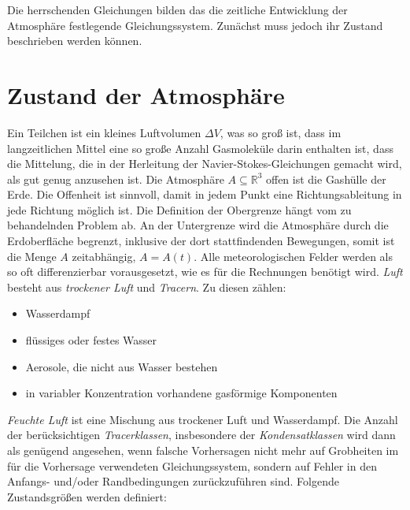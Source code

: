 \documentclass{book}
\begin{document}
Die herrschenden Gleichungen bilden das die zeitliche Entwicklung der Atmosphäre festlegende Gleichungssystem. Zunächst muss jedoch ihr Zustand beschrieben werden können.

\section{Zustand der Atmosphäre}
\label{sec:zustand_der_atmosphaere}

Ein Teilchen ist ein kleines Luftvolumen $\Delta V$, was so groß ist, dass im langzeitlichen Mittel eine so große Anzahl Gasmoleküle darin enthalten ist, dass die Mittelung, die in der Herleitung der Navier-Stokes-Gleichungen gemacht wird, als gut genug anzusehen ist. Die Atmosphäre $A\subseteq\mathbb{R}^3$ offen ist die Gashülle der Erde. Die Offenheit ist sinnvoll, damit in jedem Punkt eine Richtungsableitung in jede Richtung möglich ist. Die Definition der Obergrenze hängt vom zu behandelnden Problem ab. An der Untergrenze wird die Atmosphäre durch die Erdoberfläche begrenzt, inklusive der dort stattfindenden Bewegungen, somit ist die Menge $A$ zeitabhängig, $A = A\left(t\right)$. Alle meteorologischen Felder werden als so oft differenzierbar vorausgesetzt, wie es für die Rechnungen benötigt wird. \textit{Luft} besteht aus \textit{trockener Luft} und \textit{Tracern}. Zu diesen zählen:
%
\begin{itemize}
\item Wasserdampf
\item flüssiges oder festes Wasser
\item Aerosole, die nicht aus Wasser bestehen
\item in variabler Konzentration vorhandene gasförmige Komponenten
\end{itemize}
%
\textit{Feuchte Luft} ist eine Mischung aus trockener Luft und Wasserdampf. Die Anzahl der berücksichtigen \textit{Tracerklassen}, insbesondere der \textit{Kondensatklassen} wird dann als genügend angesehen, wenn falsche Vorhersagen nicht mehr auf Grobheiten im für die Vorhersage verwendeten Gleichungssystem, sondern auf Fehler in den Anfangs- und/oder Randbedingungen zurückzuführen sind. Folgende Zustandsgrößen werden definiert:
%
\end{document}
